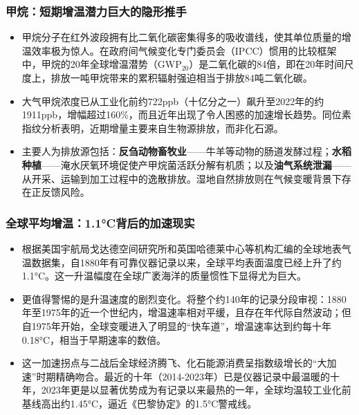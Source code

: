 \documentclass[11pt]{beamer}
\begin{document}
\begin{frame}
\frametitle{甲烷：短期增温潜力巨大的隐形推手}
\begin{itemize}
    \item 甲烷分子在红外波段拥有比二氧化碳密集得多的吸收谱线，使其单位质量的增温效率极为惊人。在政府间气候变化专门委员会（IPCC）惯用的比较框架中，\alert{甲烷的20年全球增温潜势（GWP$_{20}$）是二氧化碳的84倍}，即在20年时间尺度上，排放一吨甲烷带来的累积辐射强迫相当于排放84吨二氧化碳。
    
    \item 大气甲烷浓度已从工业化前约\alert{722ppb（十亿分之一）}飙升至2022年的约\alert{1911ppb}，增幅超过160\%，而且近年出现了令人困惑的加速增长趋势。同位素指纹分析表明，近期增量主要来自生物源排放，而非化石源。
    
    \item 主要人为排放源包括：\textbf{反刍动物畜牧业}——牛羊等动物的肠道发酵过程；\textbf{水稻种植}——淹水厌氧环境促使产甲烷菌活跃分解有机质；以及\textbf{油气系统泄漏}——从开采、运输到加工过程中的逸散排放。湿地自然排放则在气候变暖背景下存在正反馈风险。
\end{itemize}
\end{frame}

\begin{frame}
\frametitle{全球平均增温：1.1°C背后的加速现实}
\begin{itemize}
    \item 根据美国宇航局戈达德空间研究所和英国哈德莱中心等机构汇编的全球地表气温数据集，自1880年有可靠仪器记录以来，全球平均表面温度已经上升了约\alert{1.1°C}。这一升温幅度在全球广袤海洋的质量惯性下显得尤为巨大。
    
    \item 更值得警惕的是升温速度的剧烈变化。将整个约140年的记录分段审视：1880年至1975年的近一个世纪内，增温速率相对平缓，且存在年代际自然波动；但自\alert{1975年开始}，全球变暖进入了明显的“快车道”，增温速率达到约\alert{每十年0.18°C}，相当于早期速率的数倍。
    
    \item 这一加速拐点与二战后全球经济腾飞、化石能源消费呈指数级增长的“大加速”时期精确吻合。最近的十年（2014-2023年）已是仪器记录中最温暖的十年，2023年更是以显著优势成为有记录以来最热的一年，全球均温较工业化前基线高出约1.45°C，逼近《巴黎协定》的1.5°C警戒线。
\end{itemize}
\end{frame}
\end{document}
